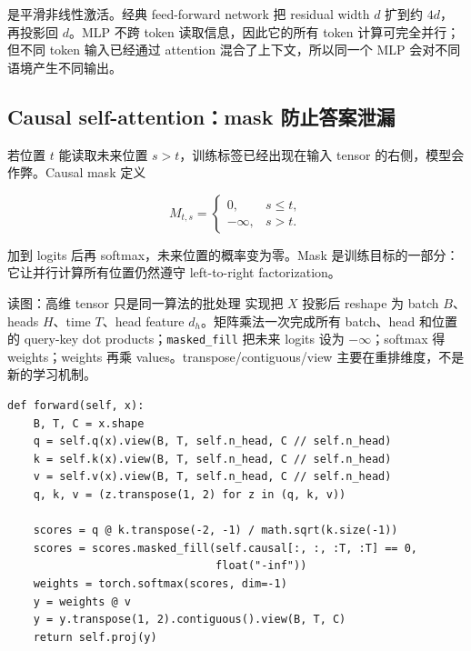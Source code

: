 
 是平滑非线性激活。经典 feed-forward network 把 residual width $d$ 扩到约 $4d$，再投影回 $d$。MLP 不跨 token 读取信息，因此它的所有 token 计算可完全并行；但不同 token 输入已经通过 attention 混合了上下文，所以同一个 MLP 会对不同语境产生不同输出。

\subsection{Causal self-attention：mask 防止答案泄漏}

若位置 $t$ 能读取未来位置 $s>t$，训练标签已经出现在输入 tensor 的右侧，模型会作弊。Causal mask 定义

\[
M_{t,s}=\begin{cases}
0,&s\le t,\\
-\infty,&s>t.
\end{cases}
\]

加到 logits 后再 softmax，未来位置的概率变为零。Mask 是训练目标的一部分：它让并行计算所有位置仍然遵守 left-to-right factorization。


\begin{knowledgebox}{读图：高维 tensor 只是同一算法的批处理}
实现把 $X$ 投影后 reshape 为 batch $B$、heads $H$、time $T$、head feature $d_h$。矩阵乘法一次完成所有 batch、head 和位置的 query-key dot products；\texttt{masked\_fill} 把未来 logits 设为 $-\infty$；softmax 得 weights；weights 再乘 values。transpose/contiguous/view 主要在重排维度，不是新的学习机制。
\end{knowledgebox}

\begin{lstlisting}[caption={带形状注释的最小 causal self-attention forward。}]
def forward(self, x):
    B, T, C = x.shape
    q = self.q(x).view(B, T, self.n_head, C // self.n_head)
    k = self.k(x).view(B, T, self.n_head, C // self.n_head)
    v = self.v(x).view(B, T, self.n_head, C // self.n_head)
    q, k, v = (z.transpose(1, 2) for z in (q, k, v))

    scores = q @ k.transpose(-2, -1) / math.sqrt(k.size(-1))
    scores = scores.masked_fill(self.causal[:, :, :T, :T] == 0,
                                float("-inf"))
    weights = torch.softmax(scores, dim=-1)
    y = weights @ v
    y = y.transpose(1, 2).contiguous().view(B, T, C)
    return self.proj(y)
\end{lstlisting}

